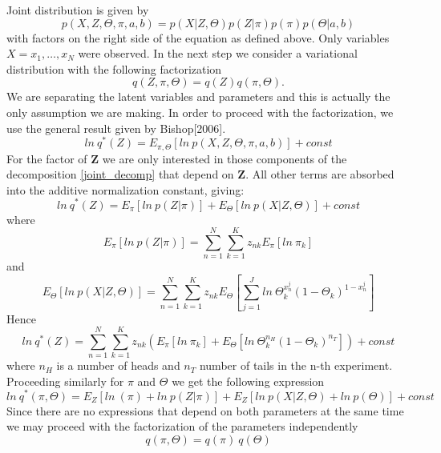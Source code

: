 \documentclass{article}
\newcommand\JointProb{p(X,Z,\Theta,\pi,a,b)}
\newcommand\ProbSingleCoin{\Theta_k^{x_n^j}(1-\Theta_k)^{1-x_n^j}}
\newcommand\ProbAllCoins{\Theta_k^{n_H}(1-\Theta_k)^{n_T}}
\newcommand\SumK{\sum_{k=1}^{K}}
\newcommand\SumN{\sum_{n=1}^{N}}
\newcommand\SumJ{\sum_{j=1}^{J}}
\begin{document}
Joint distribution is given by
\begin{equation}\label{joint_decomp}
    \JointProb{} = p(X|Z,\Theta)p(Z|\pi)p(\pi)p(\Theta|a,b)
\end{equation}
with factors on the right side of the equation as defined above. Only variables $X={x_1,\dots,x_N}$ were observed. In the next step we consider a variational distribution with the following factorization
\begin{equation}\label{factor_decomp1}
q(Z, \pi, \Theta) = q(Z)q(\pi,\Theta).
\end{equation}
We are separating the latent variables and parameters and this is actually the only assumption we are making.
In order to proceed with the factorization, we use the general result given by Bishop[2006].
\begin{equation}
    ln\: q^*(Z)=E_{\pi,\Theta}[ln\:\JointProb] + const
\end{equation}
For the factor of \textbf{Z} we are only interested in those components of the decomposition \ref{joint_decomp} that depend on \textbf{Z}. All other terms are absorbed into the additive normalization constant, giving:
\begin{equation}
    ln\: q^*(Z)=E_{\pi}[ln\:p(Z|\pi)] + E_\Theta[ln\:p(X|Z,\Theta)] + const
\end{equation}
where
\begin{equation}
    E_{\pi}[ln\:p(Z|\pi)]  = \SumN\SumK z_{nk}E_\pi[ln\:\pi_k]
\end{equation}
and
\begin{equation}
    E_\Theta[ln\:p(X|Z,\Theta)] = \SumN\SumK z_{nk}E_\Theta[\SumJ ln\:\ProbSingleCoin]
\end{equation}
Hence
\begin{equation}
    ln\: q^*(Z)=\SumN\SumK z_{nk}\left(E_\pi[ln\:\pi_k] + E_\Theta[ln\:\ProbAllCoins]\right) + const
\end{equation}
where $n_H$ is a number of heads and $n_T$ number of tails in the n-th experiment.
Proceeding similarly for \textbf{$\pi$} and \textbf{$\Theta$} we get the following expression
\begin{equation}
    ln\: q^*(\pi,\Theta)=E_{Z}[ln\:(\pi) + ln\:p(Z|\pi)] + E_Z[ln\:p(X|Z,\Theta) + ln\:p(\Theta)] + const
\end{equation}
Since there are no expressions that depend on both parameters at the same time we may proceed with the factorization of the parameters independently
\begin{equation}\label{factor_decomp2}
    q(\pi,\Theta) = q(\pi)\:q(\Theta)
\end{equation}
\end{document}

